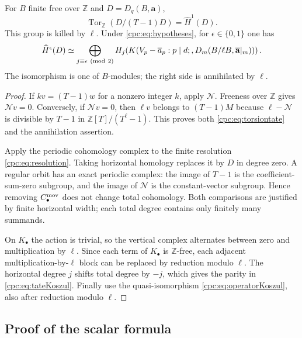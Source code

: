 \begin{lemma}
\label{cpc:lem:tate}
For $B$ finite free over $\mathbb Z$ and $D=D_q(B,\mathbf a)$,
\begin{equation}\label{cpc:eq:torsiontate}
 \operatorname{Tor}_{\mathbb Z}(D/(T-1)D)
       =\widehat H^1(D).
\end{equation}
This group is killed by $\ell$. Under
\eqref{cpc:eq:hypotheses}, for $\epsilon\in\{0,1\}$ one has
\begin{equation}\label{cpc:eq:tateKoszul}
 \widehat H^\epsilon(D)\simeq
 \bigoplus_{j\equiv\epsilon\ ({\rm mod}\ 2)}
 H_j\!\left(
 K(V_p-\overline a_p:p\mid d;,
        D_m(B/\ell B,\overline{\mathbf a}|_m))\right).
\end{equation}
The isomorphism is one of $B$-modules; the right side is annihilated
by $\ell$.
\end{lemma}
\begin{proof}
If $kv=(T-1)w$ for a nonzero integer $k$, apply $\mathcal N$.
Freeness over $\mathbb Z$ gives $\mathcal N v=0$. Conversely,
if $\mathcal N v=0$, then $\ell v$ belongs to $(T-1)M$ because
$\ell-\mathcal N$ is divisible by $T-1$ in
$\mathbb Z[T]/(T^\ell-1)$. This proves both
\eqref{cpc:eq:torsiontate} and the annihilation assertion.

Apply the periodic cohomology complex to the finite resolution
\eqref{cpc:eq:resolution}. Taking horizontal homology replaces it
by $D$ in degree zero. A regular orbit has an exact periodic complex:
the image of $T-1$ is the coefficient-sum-zero subgroup, and the image
of $\mathcal N$ is the constant-vector subgroup. Hence removing
$C_\bullet^{\rm mov}$ does not change total cohomology. Both
comparisons are justified by finite horizontal width; each total
degree contains only finitely many summands.

On $K_\bullet$ the action is trivial, so the vertical complex
alternates between zero and multiplication by $\ell$. Since each
term of $K_\bullet$ is $\mathbb Z$-free, each adjacent
multiplication-by-$\ell$ block can be replaced by reduction modulo
$\ell$. The horizontal degree $j$ shifts total degree by $-j$,
which gives the parity in \eqref{cpc:eq:tateKoszul}. Finally use
the quasi-isomorphism \eqref{cpc:eq:operatorKoszul}, also after
reduction modulo $\ell$.
\end{proof}

\subsection{Proof of the scalar formula}

